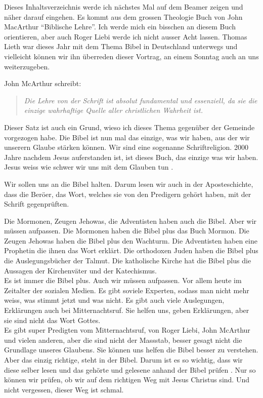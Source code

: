 Dieses Inhaltsverzeichnis werde ich nächstes Mal auf dem Beamer zeigen und näher darauf eingehen. Es kommt aus dem grossen Theologie Buch von John MacArthur \enquote{Biblische Lehre}. Ich werde mich ein bisschen an diesem Buch orientieren, aber auch Roger Liebi werde ich nicht ausser Acht lassen. Thomas Lieth war dieses Jahr mit dem Thema Bibel in Deutschland unterwegs und vielleicht können wir ihn überreden dieser Vortrag, an einem Sonntag auch an uns weiterzugeben. 

John McArthur schreibt:
\begin{quote}
    \textit{Die Lehre von der Schrift ist absolut fundamental und essenziell, da sie die einzige wahrhaftige Quelle aller christlichen Wahrheit ist.}
\end{quote}

Dieser Satz ist auch ein Grund, wieso ich dieses Thema gegenüber der Gemeinde vorgezogen habe. Die Bibel ist nun mal das einzige, was wir haben, aus der wir unserern Glaube stärken können.  Wir sind  eine sogenanne Schriftreligion. 2000 Jahre nachdem Jesus auferstanden ist, ist dieses Buch, das einzige was wir haben. Jesus weiss wie schwer wir uns mit dem Glauben tun . 

Wir sollen uns an die Bibel halten. Darum lesen wir auch in der Aposteschichte, dass die Beröer, das Wort, welches sie von den Predigern gehört haben, mit der Schrift gegenprüften.

Die Mormonen, Zeugen Jehowas, die Adventisten haben auch die Bibel.
Aber wir müssen aufpassen. Die Mormonen haben die Bibel plus das Buch Mormon. Die Zeugen Jehowas haben die Bibel plus den Wachturm. Die Adventisten haben eine Prophetin die ihnen das Wort erklärt. Die orthodoxen Juden haben die Bibel plus die Auslegungsbücher \zB{} der Talmut. Die katholische Kirche hat die Bibel plus die Aussagen der Kirchenväter und der Katechismus.\\
Es ist immer die Bibel plus. Auch wir müssen aufpassen. Vor allem heute im Zeitalter der sozialen Medien. Es gibt soviele Experten, sodass man nicht mehr weiss, was stimmt jetzt und was nicht. Es gibt auch viele Auslegungen, Erklärungen auch bei Mitternachtsruf. Sie helfen uns, geben Erklärungen, aber sie sind nicht das Wort Gottes.\\
Es gibt super Predigten vom Mitternachtsruf, von Roger Liebi, John McArthur und vielen anderen, aber die sind nicht der Massstab, besser gesagt nicht die Grundlage unseres Glaubens. Sie können uns helfen die Bibel besser zu verstehen. Aber das einzig richtige, steht in der Bibel. Darum ist es so wichtig, dass wir diese selber lesen und das gehörte und gelesene anhand der Bibel prüfen . Nur so können wir prüfen, ob wir auf dem richtigen Weg mit Jesus Christus sind. Und nicht vergessen, dieser Weg ist schmal. 

